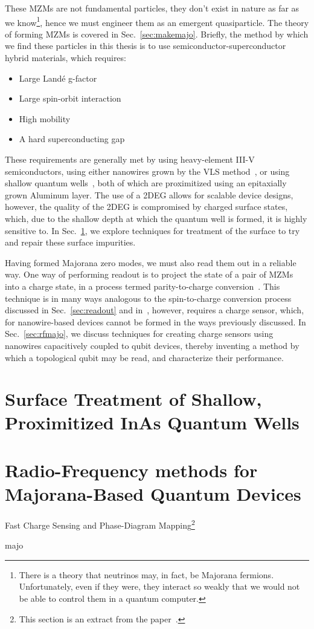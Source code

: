 These MZMs are not fundamental particles, they don't exist in nature as far as we know\footnote{There is a theory that neutrinos may, in
fact, be Majorana fermions. Unfortunately, even if they were, they interact so weakly that we would not be able to control them in a quantum computer.},
hence we must engineer them as an emergent quasiparticle. The theory of forming MZMs is covered in Sec.~\ref{sec:makemajo}. Briefly, the method by
which we find these particles in this thesis is to use semiconductor-superconductor hybrid materials, which requires:
\begin{itemize}
    \item Large Land\'e g-factor
    \item Large spin-orbit interaction
    \item High mobility
    \item A hard superconducting gap
\end{itemize}
These requirements are generally met by using heavy-element III-V semiconductors, using either nanowires grown by the VLS method~\cite{nnano.2014.306,Krogstrup},
or using shallow quantum wells~\cite{PhysRevB.93.155402}, both of which are proximitized using an epitaxially grown Aluminum layer. The use of a 2DEG allows
for scalable device designs, however, the quality of the 2DEG is compromised by charged surface states, which, due to the shallow depth at which the quantum
well is formed, it is highly sensitive to. In Sec.~\ref{sec:inas_hb}, we explore techniques for treatment of the surface to try and repair these surface impurities.

Having formed Majorana zero modes, we must also read them out in a reliable way. One way of performing readout is to project the state of a pair of MZMs into
a charge state, in a process termed parity-to-charge conversion~\cite{AasenPRX16}. This technique is in many ways analogous to the spin-to-charge conversion
process discussed in Sec.~\ref{sec:readout} and in~\cite{petta,RevModPhys.79.1217}, however, requires a charge sensor, which, for nanowire-based devices cannot
be formed in the ways previously discussed. In Sec.~\ref{sec:rfmajo}, we discuss techniques for creating charge sensors using nanowires capacitively coupled
to qubit devices, thereby inventing a method by which a topological qubit may be read, and characterize their performance.

\clearpage
\section{Surface Treatment of Shallow, Proximitized InAs Quantum Wells}
\label{sec:inas_hb}

\clearpage
\section{Radio-Frequency methods for {Majorana-Based} {Quantum} {Devices}}
{\large \bf \begin{center}Fast Charge Sensing and Phase-Diagram Mapping\footnote{
    This section is an extract from the paper~\cite{PhysRevApplied.11.064011}.
}\end{center}}
\label{sec:rfmajo}
{majo}

